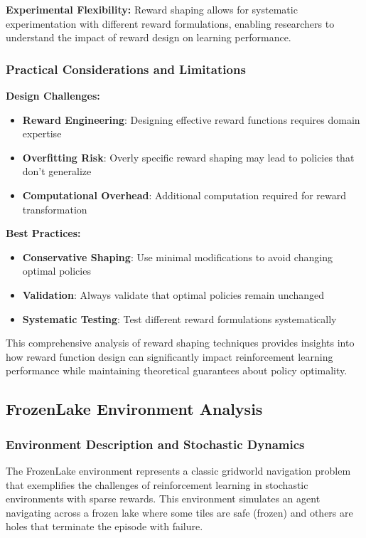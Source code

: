 \documentclass[12pt]{article}
\begin{document}
{{{\textbf{Experimental Flexibility:}
Reward shaping allows for systematic experimentation with different reward formulations, enabling researchers to understand the impact of reward design on learning performance.

\subsubsection{Practical Considerations and Limitations}

\textbf{Design Challenges:}
\begin{itemize}
    \item \textbf{Reward Engineering}: Designing effective reward functions requires domain expertise
    \item \textbf{Overfitting Risk}: Overly specific reward shaping may lead to policies that don't generalize
    \item \textbf{Computational Overhead}: Additional computation required for reward transformation
\end{itemize}

\textbf{Best Practices:}
\begin{itemize}
    \item \textbf{Conservative Shaping}: Use minimal modifications to avoid changing optimal policies
    \item \textbf{Validation}: Always validate that optimal policies remain unchanged
    \item \textbf{Systematic Testing}: Test different reward formulations systematically
\end{itemize}

This comprehensive analysis of reward shaping techniques provides insights into how reward function design can significantly impact reinforcement learning performance while maintaining theoretical guarantees about policy optimality.

\subsection{FrozenLake Environment Analysis}

\subsubsection{Environment Description and Stochastic Dynamics}

The FrozenLake environment represents a classic gridworld navigation problem that exemplifies the challenges of reinforcement learning in stochastic environments with sparse rewards. This environment simulates an agent navigating across a frozen lake where some tiles are safe (frozen) and others are holes that terminate the episode with failure.

}}}
\end{document}
